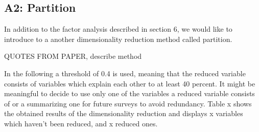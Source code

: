 \documentclass[12pt, a4paper, titlepage]{article}\usepackage[]{graphicx}\usepackage[]{color}
\begin{document}
\subsection{A2: Partition}

In addition to the factor analysis described in section 6, we would like to introduce to a another dimensionality reduction method called partition. 

QUOTES FROM PAPER, describe method 

In the following a threshold of 0.4 is used, meaning that the reduced variable consists of variables which explain each other to at least 40 percent. It might be meaningful to decide to use only one of the variables a reduced variable consists of or a summarizing one for future surveys to avoid redundancy. Table x shows the obtained results of the dimensionality reduction and displays x variables which haven't been reduced, and x reduced ones.    
\end{document}
